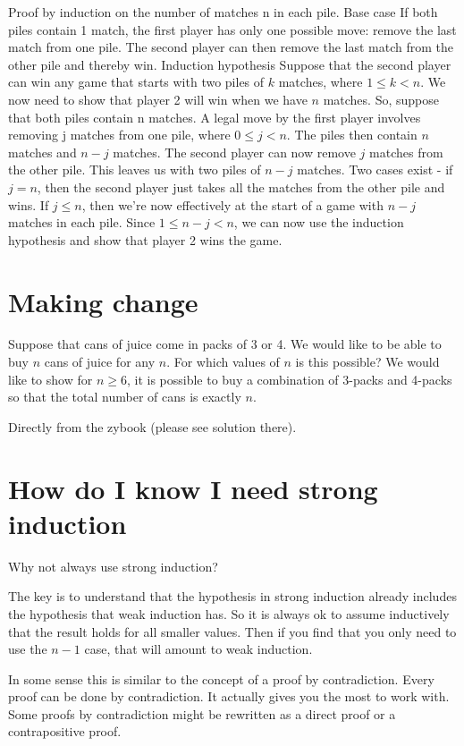 \documentclass[12pt]{article}
\begin{document}
Proof by induction on the number of matches n in each pile.
Base case If both piles contain 1 match, the first player has only one possible move:
remove the last match from one pile. The second player can then remove the last
match from the other pile and thereby win.
Induction hypothesis Suppose that the second player can win any game that starts
with two piles of $k$ matches, where $1\le k < n$. We now need to show that player 2
will win when we have $n$ matches. So, suppose that both piles contain n matches.
A legal move by the first player involves removing j matches from one pile, where
$0 \le j< n$. The piles then contain $n$ matches and $n - j$ matches. The second player
can now remove $j$ matches from the other pile. This leaves us with two piles of $n - j$
matches. Two cases exist - if $j = n$, then the second player just takes all the matches
from the other pile and wins. If $j \le n$, then we’re now effectively at the start of a game
with $n - j$ matches in each pile. Since $1 \le  n-j < n$, we can now use the induction
hypothesis and show that player 2 wins the game.

\section*{Making change}

Suppose that cans of juice come in packs of 3 or 4. We would like to be able to buy $n$ cans of juice for any $n$. For which values of $n$ is this possible? We would like to show for $n \ge 6$, it is possible to buy a combination of 3-packs and 4-packs so that the total number of cans is exactly $n$.

Directly from the zybook (please see solution there).


\section*{How do I know I need strong induction}
Why not always use strong induction? 

The key is to understand that the hypothesis in strong induction already includes the hypothesis that weak induction has. So it is always ok to assume inductively that the result holds for all smaller values. Then if you find that you only need to use the $n-1$ case, that will amount to weak induction. 

In some sense this is similar to the concept of a proof by contradiction. Every proof can be done by contradiction. It actually gives you the most to work with. Some proofs by contradiction might be rewritten as a direct proof or a contrapositive proof. 
\end{document}
